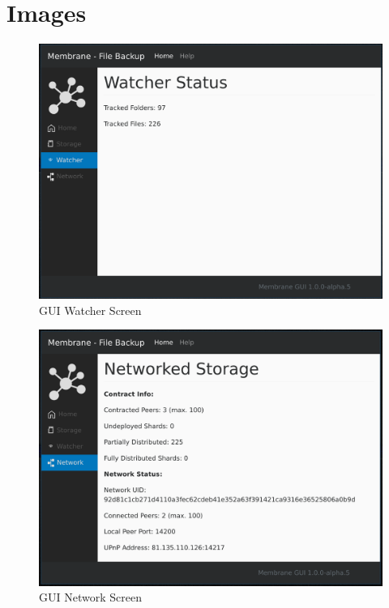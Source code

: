\documentclass[11pt, a4paper, twocolumn, twoside]{report}
\begin{document}
\pagebreak

\section{Images}

\begin{figure}[!htb]
 \centering
 \includegraphics[width=\textwidth]{gui-watcher}
 \caption{GUI Watcher Screen}
 \label{fig:gui-watcher}
\end{figure}

\begin{figure}[!htb]
 \centering
 \includegraphics[width=\textwidth]{gui-network}
 \caption{GUI Network Screen}
 \label{fig:gui-network}
\end{figure}
\end{document}
